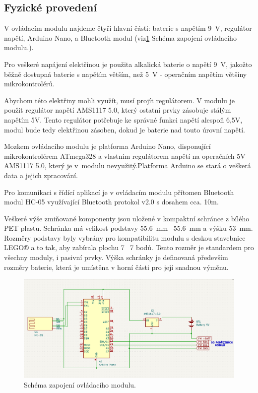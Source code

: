         \subsection{Fyzické provedení}
        V ovládacím modulu najdeme čtyři hlavní části: baterie s napětím \SI{9}{V}, regulátor napětí, Arduino Nano, a Bluetooth modul (viz\ref{fig:module-design} Schéma zapojení ovládacího modulu.).
        
        Pro veškeré napájení elektřinou je použita alkalická baterie o napětí \SI{9}{V}, jakožto běžně dostupná baterie s napětím větším, než \SI{5}{V} - operačním napětím většiny mikrokontrolérů.
        
        Abychom této elektřiny mohli využít, musí projít regulátorem. V modulu je použit regulátor napětí AMS1117 5.0, který ostatní prvky zásobuje stálým napětím 5V. Tento regulátor potřebuje ke správné funkci napětí alespoň 6,5V, modul bude tedy elektřinou zásoben, dokud je baterie nad touto úrovní napětí.
        
        Mozkem ovládacího modulu je platforma Arduino Nano, disponující mikrokontrolérem ATmega328 a vlastním regulátorem napětí na operačních 5V AMS1117 5.0, který je v~modulu nevyužitý.Platforma Arduino se stará o veškerá data a jejich zpracování.

        Pro komunikaci s řídící aplikací je v ovládacím modulu přítomen Bluetooth modul HC-05 využívající Bluetooth protokol v2.0 s dosahem cca. 10m.

        Veškeré výše zmiňované komponenty jsou uložené v kompaktní schránce z bílého PET plastu. Schránka má velikost podstavy \SI{55.6}{mm} \texttimes~\SI{55.6}{mm} a výšku \SI{53}{mm}. Rozměry podstavy byly vybrány pro kompatibilitu modulu s deskou stavebnice LEGO® a to tak, aby zabírala plochu 7 \texttimes~7 bodů. Tento rozměr je standardem pro všechny moduly, i pasivní prvky. Výška schránky je definovaná především rozměry baterie, která je umístěna v horní části pro její snadnou výměnu.

        \begin{figure}[h!]
          \includegraphics[width=\textwidth]{images/schema_ovladaci.png}
          \caption{Schéma zapojení ovládacího modulu.}
          \label{fig:module-design}
        \end{figure}

